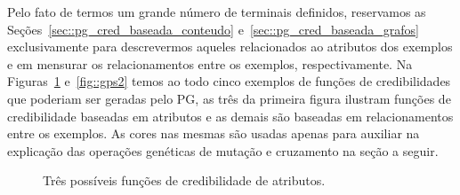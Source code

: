 Pelo fato de termos um grande número de terminais definidos, reservamos as Seções~\ref{sec::pg_cred_baseada_conteudo} e~\ref{sec::pg_cred_baseada_grafos} exclusivamente para descrevermos aqueles relacionados ao atributos dos exemplos e em mensurar os relacionamentos entre os exemplos, respectivamente. 
Na Figuras~\ref{fig::gps1} e~\ref{fig::gps2} temos ao todo cinco exemplos de funções de credibilidades que poderiam ser geradas pelo \textsc{PG}, as três da primeira figura ilustram funções de credibilidade baseadas em atributos e as demais são baseadas em relacionamentos entre os exemplos. As cores nas mesmas são usadas apenas para auxiliar na explicação das operações genéticas de mutação e cruzamento na seção a seguir.

\begin{figure}[ht]
\centering
\caption{Três possíveis funções de credibilidade de atributos.}
\label{fig::gps1}
\end{figure}


